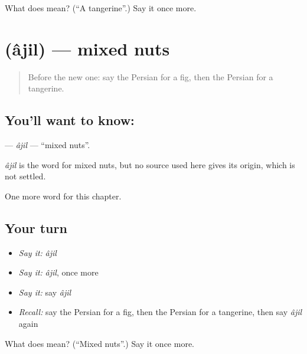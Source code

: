 \begin{tcolorbox}[breakable,colback=teal!4,colframe=teal!35!black,title={Before you move on}]
What does  mean? (\textquotedblleft{}A tangerine\textquotedblright{}.) Say it once more.
\end{tcolorbox}
\section[\texorpdfstring{\fa{آجیل} (âjil)}{آجیل (âjil)}]{ (âjil) — mixed nuts}

\label{lesson:FA-C241-ajil}



\begin{quote}
Before the new one: say the Persian for a fig, then the Persian for a tangerine.
\end{quote}

\subsection*{You'll want to know: }
\textbf{} — \emph{âjil} — \textquotedblleft{}mixed nuts\textquotedblright{}.

\begin{cousinweb}
\emph{âjil} is the word for mixed nuts, but no source used here gives its origin, which is not settled.
\end{cousinweb}

\begin{grammarlens}[title={What you've built}]
One more word for this chapter.
\end{grammarlens}

\subsection*{Your turn}
\begin{itemize}
\raggedright
  \item \emph{Say it:} \emph{âjil}
  \item \emph{Say it:} \emph{âjil}, once more
  \item \emph{Say it:} say \emph{âjil}
  \item \emph{Recall:} say the Persian for a fig, then the Persian for a tangerine, then say \emph{âjil} again
\end{itemize}

\begin{tcolorbox}[breakable,colback=teal!4,colframe=teal!35!black,title={Before you move on}]
What does  mean? (\textquotedblleft{}Mixed nuts\textquotedblright{}.) Say it once more.
\end{tcolorbox}
